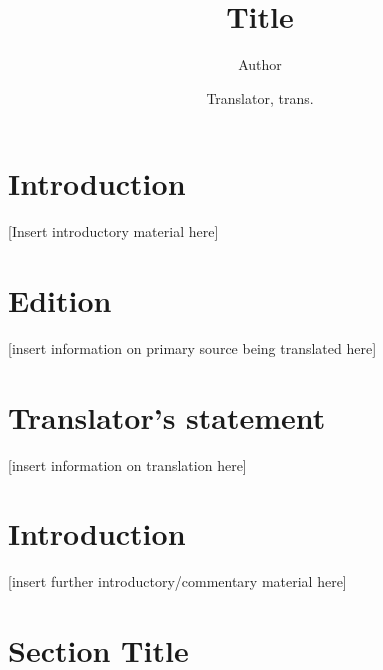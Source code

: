 \documentclass[12pt]{article}
\title{Title}
\author{
Author\\
\and
Translator, trans.}
\begin{document}
\maketitle

\section*{Introduction}

[Insert introductory material here]


\section*{Edition}
[insert information on primary source being translated here]


\section*{Translator's statement}
[insert information on translation here]


\section*{Introduction}
[insert further introductory/commentary material here]

\section*{Section Title}
\begin{parcolumns}{2}
\colplacechunks
\colplacechunks

\end{parcolumns}


\end{document}
